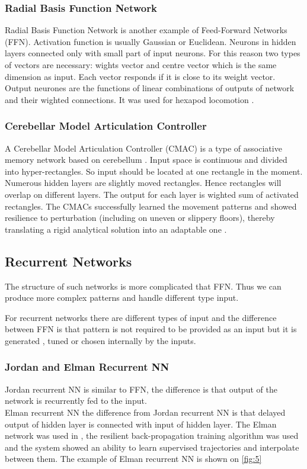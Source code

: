 \documentclass[12pt,a4paper]{report}
\begin{document}
				\subsubsection{Radial Basis Function Network}
					Radial Basis Function Network is another example of Feed-Forward Networks (FFN). Activation function is usually Gaussian or Euclidean. Neurons in hidden layers connected only with small part of input neurons. For this reason two types of vectors are necessary: wights vector and centre vector which is the same dimension as input. Each vector responds if it is close to its weight vector. Output neurones are the functions of linear combinations of outputs of network and their wighted connections.
					It was used for hexapod locomotion \cite{ilg1995learning}.
				\subsubsection{Cerebellar Model Articulation Controller}
					A Cerebellar Model Articulation Controller (CMAC) is a type of associative memory network based on cerebellum \cite{albus1975new}. Input space is continuous and divided into hyper-rectangles. So input should be located at one rectangle in the moment. Numerous hidden layers are slightly moved rectangles. Hence rectangles will overlap on different layers. The output for each layer is wighted sum of activated rectangles. The CMACs successfully learned the movement patterns and showed resilience to perturbation (including on uneven or slippery floors), thereby translating a rigid analytical solution into an adaptable one \cite{sabourin2005robustness}.
			\subsection{Recurrent Networks}
				The structure of such networks is more complicated that FFN. Thus we can produce more complex patterns and handle different type input.
				
				For recurrent networks there are different types of input and the difference between FFN is that pattern is not required to be provided as an input but it is generated , tuned or chosen internally by the inputs. 
				
				\subsubsection{Jordan and Elman Recurrent NN}
					Jordan recurrent NN is similar to FFN, the difference is that output of the network is recurrently fed to the input.\\
					Elman recurrent NN the difference from Jordan recurrent NN is that delayed output of hidden layer is connected with input of hidden layer. The Elman network was used in \cite{berns1995neural}, the resilient back-propagation training algorithm was used and the system showed an ability to learn supervised trajectories and interpolate between them. The example of Elman recurrent NN is shown on \ref{fig:5} 
					
\end{document}
